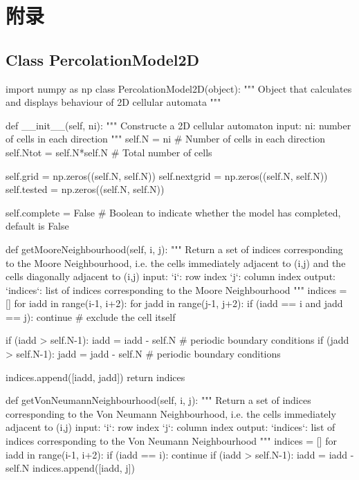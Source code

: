 \documentclass[bibend=bibtex,lang=cn,11pt,a4paper]{elegantpaper}
\begin{document}
\section{附录}

\subsection{Class PercolationModel2D}

\begin{python}
import numpy as np
class PercolationModel2D(object):
    """
    Object that calculates and displays behaviour of 2D cellular automata
    """

    def __init__(self, ni):
        """
        Constructe a 2D cellular automaton
        input:
            ni: number of cells in each direction
        """
        self.N = ni                # Number of cells in each direction
        self.Ntot = self.N*self.N  # Total number of cells

        self.grid = np.zeros((self.N, self.N))
        self.nextgrid = np.zeros((self.N, self.N))
        self.tested = np.zeros((self.N, self.N))

        self.complete = False  # Boolean to indicate whether the model has completed, default is False

    def getMooreNeighbourhood(self, i, j):
        """
        Return a set of indices corresponding to the Moore Neighbourhood, i.e. the cells immediately adjacent to (i,j) and the cells diagonally adjacent to (i,j)
        input:
            `i`: row index
            `j`: column index
        output:
            `indices`: list of indices corresponding to the Moore Neighbourhood
        """
        indices = []
        for iadd in range(i-1, i+2):
            for jadd in range(j-1, j+2):
                if (iadd == i and jadd == j):
                    continue  # exclude the cell itself

                if (iadd > self.N-1):
                    iadd = iadd - self.N  # periodic boundary conditions
                if (jadd > self.N-1):
                    jadd = jadd - self.N  # periodic boundary conditions

                indices.append([iadd, jadd])
        return indices

    def getVonNeumannNeighbourhood(self, i, j):
        """
        Return a set of indices corresponding to the Von Neumann Neighbourhood, i.e. the cells immediately adjacent to (i,j)
        input:
            `i`: row index
            `j`: column index
        output:
            `indices`: list of indices corresponding to the Von Neumann Neighbourhood
        """
        indices = []
        for iadd in range(i-1, i+2):
            if (iadd == i):
                continue
            if (iadd > self.N-1):
                iadd = iadd - self.N
            indices.append([iadd, j])


\end{python}
\end{document}
